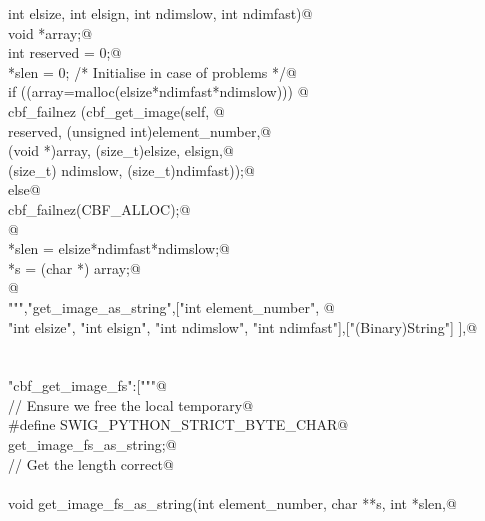 \documentclass[10pt,a4paper,twoside,notitlepage]{article}
\begin{document}
\begin{flushleft}
\begin{list}{}{}
\mbox{}\verb@    int elsize, int elsign, int ndimslow, int ndimfast){@\\
\mbox{}\verb@        void *array;@\\
\mbox{}\verb@        int reserved = 0;@\\
\mbox{}\verb@        *slen = 0; /* Initialise in case of problems */@\\
\mbox{}\verb@        if ((array=malloc(elsize*ndimfast*ndimslow))) {@\\
\mbox{}\verb@               cbf_failnez (cbf_get_image(self, @\\
\mbox{}\verb@               reserved, (unsigned int)element_number,@\\
\mbox{}\verb@               (void *)array, (size_t)elsize, elsign,@\\
\mbox{}\verb@               (size_t) ndimslow, (size_t)ndimfast));@\\
\mbox{}\verb@         }else{@\\
\mbox{}\verb@               cbf_failnez(CBF_ALLOC);@\\
\mbox{}\verb@         }@\\
\mbox{}\verb@        *slen = elsize*ndimfast*ndimslow;@\\
\mbox{}\verb@        *s = (char *) array;@\\
\mbox{}\verb@      }@\\
\mbox{}\verb@""","get_image_as_string",["int element_number", @\\
\mbox{}\verb@    "int elsize", "int elsign", "int ndimslow", "int ndimfast"],["(Binary)String"] ],@\\
\mbox{}\verb@@\\
\mbox{}\verb@@\\
\mbox{}\verb@"cbf_get_image_fs":["""@\\
\mbox{}\verb@// Ensure we free the local temporary@\\
\mbox{}\verb@%{@\\
\mbox{}\verb@#define SWIG_PYTHON_STRICT_BYTE_CHAR@\\
\mbox{}\verb@%}@\\
\mbox{}\verb@%cstring_output_allocate_size(char ** s, int *slen, free(*$1))@\\
\mbox{}\verb@       get_image_fs_as_string;@\\
\mbox{}\verb@// Get the length correct@\\
\mbox{}\verb@@\\
\mbox{}\verb@    void get_image_fs_as_string(int element_number, char **s, int *slen,@\\

\end{list}
\end{flushleft}
\end{document}
